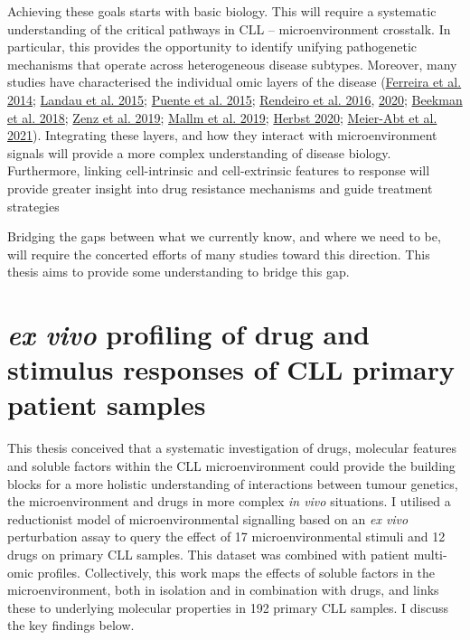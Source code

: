 \documentclass[11pt, a4paper, twosided]{book}
\begin{document}
Achieving these goals starts with basic biology. This will require a systematic understanding of the critical pathways in CLL -- microenvironment crosstalk. In particular, this provides the opportunity to identify unifying pathogenetic mechanisms that operate across heterogeneous disease subtypes. Moreover, many studies have characterised the individual omic layers of the disease (\protect\hyperlink{ref-Ferreira2014}{Ferreira et al. 2014}; \protect\hyperlink{ref-Landau2015}{Landau et al. 2015}; \protect\hyperlink{ref-Puente2015}{Puente et al. 2015}; \protect\hyperlink{ref-Rendeiro2016}{Rendeiro et al. 2016}, \protect\hyperlink{ref-Rendeiro2020}{2020}; \protect\hyperlink{ref-Beekman2018}{Beekman et al. 2018}; \protect\hyperlink{ref-Zenz2019}{Zenz et al. 2019}; \protect\hyperlink{ref-Mallm2019}{Mallm et al. 2019}; \protect\hyperlink{ref-HerbstThesis}{Herbst 2020}; \protect\hyperlink{ref-MeierAbt2021}{Meier-Abt et al. 2021}). Integrating these layers, and how they interact with microenvironment signals will provide a more complex understanding of disease biology. Furthermore, linking cell-intrinsic and cell-extrinsic features to response will provide greater insight into drug resistance mechanisms and guide treatment strategies

Bridging the gaps between what we currently know, and where we need to be, will require the concerted efforts of many studies toward this direction. This thesis aims to provide some understanding to bridge this gap.

\hypertarget{ex-vivo-profiling-of-drug-and-stimulus-responses-of-cll-primary-patient-samples}{%
\section{\texorpdfstring{\emph{ex vivo} profiling of drug and stimulus responses of CLL primary patient samples}{ex vivo profiling of drug and stimulus responses of CLL primary patient samples}}\label{ex-vivo-profiling-of-drug-and-stimulus-responses-of-cll-primary-patient-samples}}

This thesis conceived that a systematic investigation of drugs, molecular features and soluble factors within the CLL microenvironment could provide the building blocks for a more holistic understanding of interactions between tumour genetics, the microenvironment and drugs in more complex \emph{in vivo} situations. I utilised a reductionist model of microenvironmental signalling based on an \emph{ex vivo} perturbation assay to query the effect of 17 microenvironmental stimuli and 12 drugs on primary CLL samples. This dataset was combined with patient multi-omic profiles. Collectively, this work maps the effects of soluble factors in the microenvironment, both in isolation and in combination with drugs, and links these to underlying molecular properties in 192 primary CLL samples. I discuss the key findings below.
\end{document}
